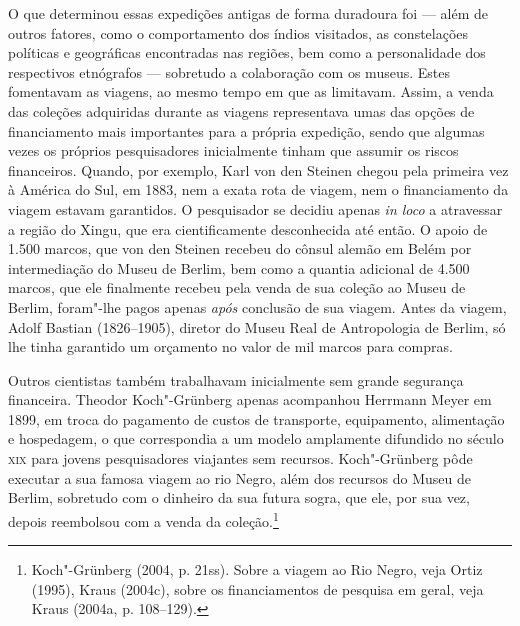 O que determinou essas expedições antigas de forma duradoura foi --- além
de outros fatores, como o comportamento dos índios visitados, as
constelações políticas e geográficas encontradas nas regiões, bem como
a personalidade dos respectivos etnógrafos --- sobretudo a colaboração
com os museus. Estes fomentavam as viagens, ao mesmo tempo em que as
limitavam. Assim, a venda das coleções adquiridas durante as viagens
representava umas das opções de financiamento mais importantes para a
própria expedição, sendo que algumas vezes os próprios pesquisadores
inicialmente tinham que assumir os riscos financeiros. Quando, por
exemplo, Karl von den Steinen chegou pela primeira vez à América do Sul,
em 1883, nem a exata rota de viagem, nem o financiamento da viagem
estavam garantidos. O pesquisador se decidiu apenas \emph{in loco} a
atravessar a região do Xingu, que era cientificamente desconhecida até
então. O apoio de 1.500 marcos, que von den Steinen recebeu do cônsul
alemão em Belém por intermediação do Museu de Berlim, bem como a quantia
adicional de 4.500 marcos, que ele finalmente recebeu pela venda de sua
coleção ao Museu de Berlim, foram"-lhe pagos apenas \emph{após}
conclusão de sua viagem. Antes da viagem, Adolf Bastian (1826--1905),
diretor do Museu Real de Antropologia de Berlim, só lhe tinha garantido
um orçamento no valor de mil marcos para compras.

Outros cientistas também trabalhavam inicialmente sem grande segurança
financeira. Theodor Koch"-Grünberg apenas acompanhou Herrmann Meyer em
1899, em troca do pagamento de custos de transporte, equipamento,
alimentação e hospedagem, o que correspondia a um modelo amplamente
difundido no século \textsc{xix} para jovens pesquisadores viajantes sem
recursos. Koch"-Grünberg pôde executar a sua famosa viagem ao rio Negro,
além dos recursos do Museu de Berlim, sobretudo com o dinheiro da sua
futura sogra, que ele, por sua vez, depois reembolsou com a venda da
coleção.\footnote{Koch"-Grünberg (2004, p. 21ss). Sobre a viagem ao Rio
  Negro, veja Ortiz (1995), Kraus (2004c), sobre os financiamentos de
  pesquisa em geral, veja Kraus (2004a, p. 108--129).}

